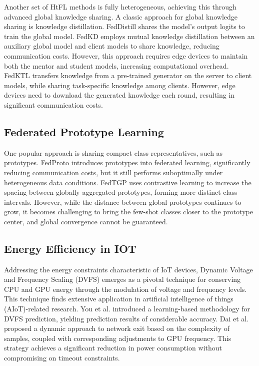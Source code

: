 \documentclass[journal]{IEEEtran}
\begin{document}
Another set of HtFL methods is fully heterogeneous, achieving this through advanced global knowledge sharing. A classic approach for global knowledge sharing is knowledge distillation. FedDistill\cite{jeong2018communication} shares the model's output logits to train the global model. FedKD \cite{wu2022communication} employs mutual knowledge distillation between an auxiliary global model and client models to share knowledge, reducing communication costs. However, this approach requires edge devices to maintain both the mentor and student models, increasing computational overhead. FedKTL\cite{zhang_upload-efficient_2024} transfers knowledge from a pre-trained generator on the server to client models, while sharing task-specific knowledge among clients. However, edge devices need to download the generated knowledge each round, resulting in significant communication costs.

\subsection{Federated Prototype Learning}
One popular approach is sharing compact class representatives, such as prototypes. FedProto\cite{tan_fedproto_2021} introduces prototypes into federated learning, significantly reducing communication costs, but it still performs suboptimally under heterogeneous data conditions. FedTGP\cite{zhang_fedtgp_2024} uses contrastive learning to increase the spacing between globally aggregated prototypes, forming more distinct class intervals. However, while the distance between global prototypes continues to grow, it becomes challenging to bring the few-shot classes closer to the prototype center, and global convergence cannot be guaranteed.

\subsection{Energy Efficiency in IOT}
Addressing the energy constraints characteristic of IoT devices, Dynamic Voltage and Frequency Scaling (DVFS) emerges as a pivotal technique for conserving CPU and GPU energy through the modulation of voltage and frequency levels. This technique finds extensive application in artificial intelligence of things (AIoT)-related research. You et al. \cite{you2023zeus} introduced a learning-based methodology for DVFS prediction, yielding prediction results of considerable accuracy. Dai et al.\cite{dai2024energy} proposed a dynamic approach to network exit based on the complexity of samples, coupled with corresponding adjustments to GPU frequency. This strategy achieves a significant reduction in power consumption without compromising on timeout constraints.
\end{document}
